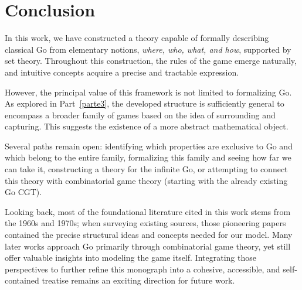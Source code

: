 \newpage
\section{Conclusion}

In this work, we have constructed a theory capable of formally describing classical Go from elementary notions, \emph{where, who, what, and how}, supported by set theory. Throughout this construction, the rules of the game emerge naturally, and intuitive concepts acquire a precise and tractable expression.

However, the principal value of this framework is not limited to formalizing Go. As explored in Part~\ref{parte3}, the developed structure is sufficiently general to encompass a broader family of games based on the idea of surrounding and capturing. This suggests the existence of a more abstract mathematical object.

Several paths remain open: identifying which properties are exclusive to Go and which belong to the entire family, formalizing this family and seeing how far we can take it, constructing a theory for the infinite Go, or attempting to connect this theory with combinatorial game theory (starting with the already existing Go CGT).

\vfill

Looking back, most of the foundational literature cited in this work stems from the 1960s and 1970s; when surveying existing sources, those pioneering papers contained the precise structural ideas and concepts needed for our model. Many later works approach Go primarily through combinatorial game theory, yet still offer valuable insights into modeling the game itself. Integrating those perspectives to further refine this monograph into a cohesive, accessible, and self-contained treatise remains an exciting direction for future work.